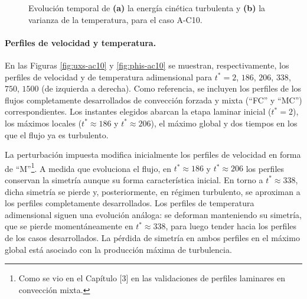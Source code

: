\begin{figure}[H]
  \centering  
  \caption{Evolución temporal de \textbf{(a)} la energía cinética turbulenta y \textbf{(b)} la varianza de la temperatura, para el caso A-C10.}
  \label{fig:ac10-2}
\end{figure}

\paragraph{Perfiles de velocidad y temperatura.}
En las Figuras \ref{fig:uxs-ac10} y \ref{fig:phis-ac10} se muestran, respectivamente, los perfiles de velocidad y de temperatura adimensional para $t^*=2$, $186$, $206$, $338$, $750$, $1500$ (de izquierda a derecha). Como referencia, se incluyen los perfiles de los flujos completamente desarrollados de convección forzada y mixta (``FC'' y ``MC'') correspondientes. Los instantes elegidos abarcan la etapa laminar inicial ($t^*=2$), los máximos locales ($t^* \approx 186$ y $t^* \approx 206$), el máximo global y dos tiempos en los que el flujo ya es turbulento.

La perturbación impuesta modifica inicialmente los perfiles de velocidad en forma de ``M''\footnote{Como se vio en el Capítulo [3] en las validaciones de perfiles laminares en convección mixta.}. A medida que evoluciona el flujo, en $t^* \approx 186$ y $t^* \approx 206$ los perfiles conservan la simetría aunque su forma característica inicial. En torno a $t^* \approx 338$, dicha simetría se pierde y, posteriormente, en régimen turbulento, se aproximan a los perfiles completamente desarrollados. Los perfiles de temperatura adimensional siguen una evolución análoga: se deforman manteniendo su simetría, que se pierde momentáneamente en $t^* \approx 338$, para luego tender hacia los perfiles de los casos desarrollados. La pérdida de simetría en ambos perfiles en el máximo global está asociado con la producción máxima de turbulencia. 

